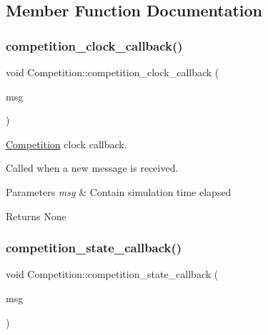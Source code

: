 \subsection{Member Function Documentation}
\mbox{\label{classCompetition_ae4695e5697587f7af4aa40ebae953534}} 
\subsubsection{\texorpdfstring{competition\+\_\+clock\+\_\+callback()}{competition\_clock\_callback()}}
{\footnotesize\ttfamily void Competition\+::competition\+\_\+clock\+\_\+callback (\begin{DoxyParamCaption}\item[{const rosgraph\+\_\+msgs\+::\+Clock\+::\+Const\+Ptr \&}]{msg }\end{DoxyParamCaption})}



\hyperlink{classCompetition}{Competition} clock callback. 

Called when a new message is received.


\begin{DoxyParams}{Parameters}
{\em msg} & Contain simulation time elapsed \\
\hline
\end{DoxyParams}
\begin{DoxyReturn}{Returns}
None 
\end{DoxyReturn}
\mbox{\label{classCompetition_a1b9545e863fc4574b29b1e43e80ebda3}} 
\subsubsection{\texorpdfstring{competition\+\_\+state\+\_\+callback()}{competition\_state\_callback()}}
{\footnotesize\ttfamily void Competition\+::competition\+\_\+state\+\_\+callback (\begin{DoxyParamCaption}\item[{const std\+\_\+msgs\+::\+String\+::\+Const\+Ptr \&}]{msg }\end{DoxyParamCaption})}



